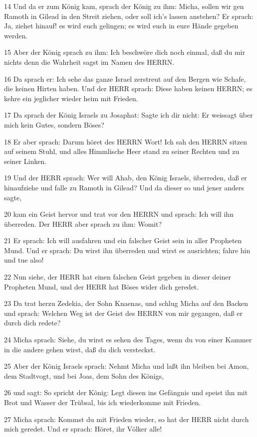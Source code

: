 \par 14 Und da er zum König kam, sprach der König zu ihm: Micha, sollen wir gen Ramoth in Gilead in den Streit ziehen, oder soll ich's lassen anstehen? Er sprach: Ja, ziehet hinauf! es wird euch gelingen; es wird euch in eure Hände gegeben werden.
\par 15 Aber der König sprach zu ihm: Ich beschwöre dich noch einmal, daß du mir nichts denn die Wahrheit sagst im Namen des HERRN.
\par 16 Da sprach er: Ich sehe das ganze Israel zerstreut auf den Bergen wie Schafe, die keinen Hirten haben. Und der HERR sprach: Diese haben keinen HERRN; es kehre ein jeglicher wieder heim mit Frieden.
\par 17 Da sprach der König Israels zu Josaphat: Sagte ich dir nicht: Er weissagt über mich kein Gutes, sondern Böses?
\par 18 Er aber sprach: Darum höret des HERRN Wort! Ich sah den HERRN sitzen auf seinem Stuhl, und alles Himmlische Heer stand zu seiner Rechten und zu seiner Linken.
\par 19 Und der HERR sprach: Wer will Ahab, den König Israels, überreden, daß er hinaufziehe und falle zu Ramoth in Gilead? Und da dieser so und jener anders sagte,
\par 20 kam ein Geist hervor und trat vor den HERRN und sprach: Ich will ihn überreden. Der HERR aber sprach zu ihm: Womit?
\par 21 Er sprach: Ich will ausfahren und ein falscher Geist sein in aller Propheten Mund. Und er sprach: Du wirst ihn überreden und wirst es ausrichten; fahre hin und tue also!
\par 22 Nun siehe, der HERR hat einen falschen Geist gegeben in dieser deiner Propheten Mund, und der HERR hat Böses wider dich geredet.
\par 23 Da trat herzu Zedekia, der Sohn Knaenas, und schlug Micha auf den Backen und sprach: Welchen Weg ist der Geist des HERRN von mir gegangen, daß er durch dich redete?
\par 24 Micha sprach: Siehe, du wirst es sehen des Tages, wenn du von einer Kammer in die andere gehen wirst, daß du dich versteckst.
\par 25 Aber der König Israels sprach: Nehmt Micha und laßt ihn bleiben bei Amon, dem Stadtvogt, und bei Joas, dem Sohn des Königs,
\par 26 und sagt: So spricht der König: Legt diesen ins Gefängnis und speist ihn mit Brot und Wasser der Trübsal, bis ich wiederkomme mit Frieden.
\par 27 Micha sprach: Kommst du mit Frieden wieder, so hat der HERR nicht durch mich geredet. Und er sprach: Höret, ihr Völker alle!
